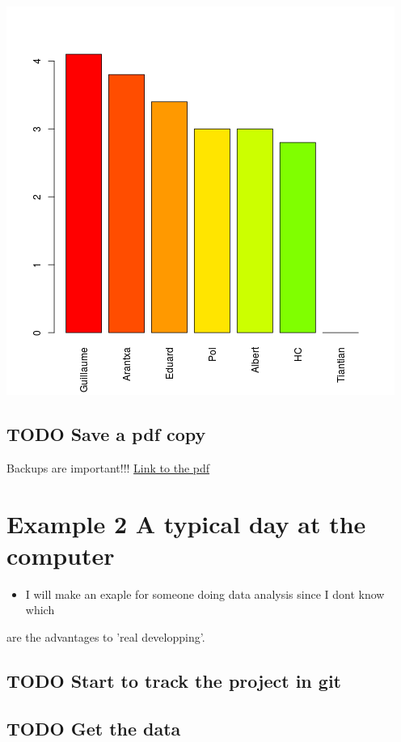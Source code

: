 \documentclass[11pt]{article}
\begin{document}
\begin{center}
\includegraphics[width=.9\linewidth]{geektbl.png}
\end{center}

\subsection{{\bfseries\sffamily TODO} Save a pdf copy}
\label{sec:org4090ad4}
Backups are important!!!
\href{orgnotebook.pdf}{Link to the pdf}
\section{Example 2 A typical day at the computer}
\label{sec:orgb9d827e}
\begin{itemize}
\item I will make an exaple for someone doing data analysis since I dont know which
\end{itemize}
are the advantages to 'real developping'.
\subsection{{\bfseries\sffamily TODO} Start to track the project in git}
\label{sec:org643b774}
\subsection{{\bfseries\sffamily TODO} Get the data}
\label{sec:orgd866f2f}
\end{document}
